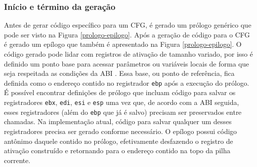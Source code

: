 \subsubsection{Início e término da geração}

Antes de gerar código específico para um CFG,%
é gerado um prólogo genérico que pode ser visto na
Figura \ref{prologo-epilogo}. Após a geração de código para o CFG é
gerado um epílogo que também é
apresentado na Figura \ref{prologo-epilogo}. O código gerado pode
lidar com registros de ativação de tamanho variado, por isso é
definido um ponto base para acessar
parâmetros ou variáveis locais de forma que seja respeitada as
condições da ABI \cite{systemv-abi}. Essa base, ou ponto de referência, fica definida como
o endereço contido no registrador \verb!ebp! após a execução do
prólogo. É possível encontrar definições de prólogo que incluam código
para salvar os registradores \verb!ebx!, \verb!edi!, \verb!esi!
e \verb!esp! uma vez que, de acordo com a ABI seguida, esses
registradores (além do \verb!ebp! que já é salvo) precisam ser
preservados entre chamadas. Na
implementação atual, código para salvar qualquer um desses
registradores precisa ser gerado conforme necessário. O epílogo possui
código antônimo daquele contido no prólogo, efetivamente desfazendo o
registro de ativação construído e retornando para o endereço contido
na topo da pilha corrente.

